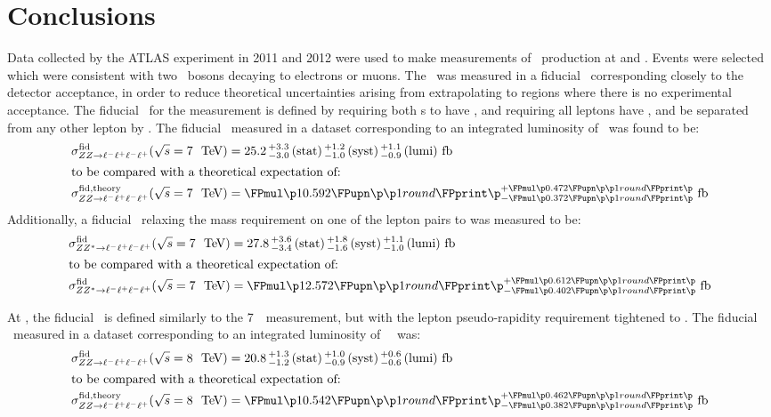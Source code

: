 \graphicspath{{Chapters/Conclusions/Figures/}}
\chapter{Conclusions}
\label{chap:Conclusions}
Data collected by the ATLAS experiment in 2011 and 2012 were used to make
measurements of \ZZ\ production at  and .
Events were selected which were consistent with two \Z\ bosons decaying to
electrons or muons. The \cx\ was measured in a fiducial \phasespace\
corresponding closely to the detector acceptance, in order to reduce theoretical
uncertainties arising from extrapolating to regions where there is no
experimental acceptance.
The fiducial \phasespace\ for the \sqrtseq{7} measurement is defined by
requiring both \leppair s to have \sstooos, and requiring all leptons have ,
\modetalt{3.16} and be separated from any other lepton by \deltaRlt{0.2}. The
fiducial \cx\ measured in a
dataset corresponding to an integrated luminosity of
\LumiPassGRLTwentyEleven~\ifb was found to be:
\begin{align}
\sigmaFidZZllll(\sqrtseq{7}) &= \ZZSevenTeVFiducialCrossSectionZZLLLL \\
\intertext{to be compared with a theoretical expectation of:}
\sigmaFidTheoryZZllll(\sqrtseq{7}) &= \ZZSevenTeVTheoryFiducialCrossSectionZZLLLL
\end{align}
Additionally, a fiducial \cx\ relaxing the mass requirement on one of the lepton pairs
to \mllgtt was measured to be:
\begin{align}
\sigmaFidZZsllll(\sqrtseq{7}) &= \ZZSevenTeVFiducialCrossSectionZZsLLLL \\
\intertext{to be compared with a theoretical expectation of:}
\sigmaFidZZsllll(\sqrtseq{7}) &= \ZZSevenTeVTheoryFiducialCrossSectionZZsLLLL
\end{align}

At , the fiducial \phasespace\ is defined similarly to the 7~\tev\
measurement, but with the lepton pseudo-rapidity requirement tightened to
\modetalt{2.7}. The fiducial \cx\ measured in a dataset corresponding to an integrated luminosity of
\LumiPassGRLTwentyTwelve~\ifb\ was:
\begin{align}
\sigmaFidZZllll(\sqrtseq{8}) &= \ZZEightTeVFiducialCrossSectionZZLLLL \\
\intertext{to be compared with a theoretical expectation of:}
\sigmaFidTheoryZZllll(\sqrtseq{8}) &= \ZZEightTeVTheoryFiducialCrossSectionZZLLLL
\end{align}

